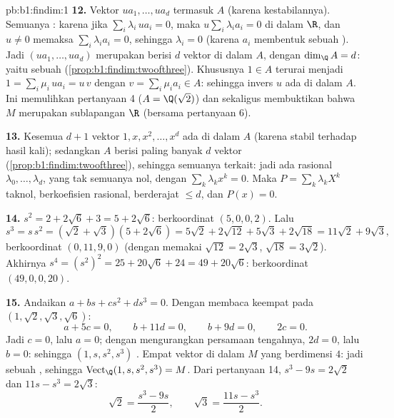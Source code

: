\begin{solution}{pb:b1:findim:1}
\textbf{12.} Vektor $u a_1, \dots, u a_d$ termasuk $A$
(karena kestabilannya). Semuanya : karena jika $\sum_i \lambda_i\, u a_i = 0$,
maka $u \sum_i \lambda_i a_i = 0$ di dalam $\R$, dan $u \neq 0$ memaksa
$\sum_i \lambda_i a_i = 0$, sehingga $\lambda_i = 0$ (karena $a_i$ membentuk
sebuah ). Jadi $(u a_1, \dots, u a_d)$ merupakan  berisi $d$
vektor di dalam $A$, dengan $\dim_\Q A = d$: yaitu sebuah 
(\cref{prop:b1:findim:twoofthree}). Khususnya $1 \in A$
terurai menjadi $1 = \sum_i \mu_i\, u a_i = u\,v$ dengan $v = \sum_i
\mu_i a_i \in A$: sehingga invers $u$ ada di dalam $A$. Ini memulihkan
pertanyaan 4 ($A = \Q(\sqrt2)$) dan sekaligus membuktikan bahwa $M$
merupakan sublapangan $\R$ (bersama pertanyaan 6).

\textbf{13.} Kesemua $d + 1$ vektor $1, x, x^2, \dots, x^{d}$
ada di dalam $A$ (karena stabil terhadap hasil kali); sedangkan  $A$ berisi
paling banyak $d$ vektor (\cref{prop:b1:findim:twoofthree}), sehingga semuanya
terkait: jadi ada rasional $\lambda_0, \dots, \lambda_d$,
yang tak semuanya nol, dengan $\sum_k \lambda_k x^k = 0$. Maka  $P
= \sum_k \lambda_k X^k$ taknol, berkoefisien rasional,
berderajat $\leq d$, dan $P(x) = 0$.

\textbf{14.} $s^2 = 2 + 2\sqrt6 + 3 = 5 + 2\sqrt6$: berkoordinat
$(5, 0, 0, 2)$. Lalu
\[
s^3 = s\,s^2 = (\sqrt2 + \sqrt3)(5 + 2\sqrt6)
= 5\sqrt2 + 2\sqrt{12} + 5\sqrt3 + 2\sqrt{18}
= 11\sqrt2 + 9\sqrt3 ,
\]
berkoordinat $(0, 11, 9, 0)$ (dengan memakai $\sqrt{12} = 2\sqrt3$,
$\sqrt{18} = 3\sqrt2$). Akhirnya $s^4 = (s^2)^2 = 25 + 20\sqrt6 +
24 = 49 + 20\sqrt6$: berkoordinat $(49, 0, 0, 20)$.

\textbf{15.} Andaikan $a + bs + cs^2 + ds^3 = 0$. Dengan membaca keempat
 pada $(1, \sqrt2, \sqrt3, \sqrt6)$:
\[
a + 5c = 0,\qquad b + 11d = 0,\qquad b + 9d = 0,\qquad 2c = 0 .
\]
Jadi $c = 0$, lalu $a = 0$; dengan mengurangkan persamaan tengahnya, $2d =
0$, lalu $b = 0$: sehingga $(1, s, s^2, s^3)$ . Empat vektor 
di dalam $M$ yang berdimensi $4$: jadi sebuah , sehingga
$\operatorname{Vect}_\Q(1, s, s^2, s^3) = M$. Dari pertanyaan 14,
$s^3 - 9s = 2\sqrt2$ dan $11s - s^3 = 2\sqrt3$:
\[
\sqrt2 = \frac{s^3 - 9s}{2},
\qquad
\sqrt3 = \frac{11s - s^3}{2} .
\]


\end{solution}
